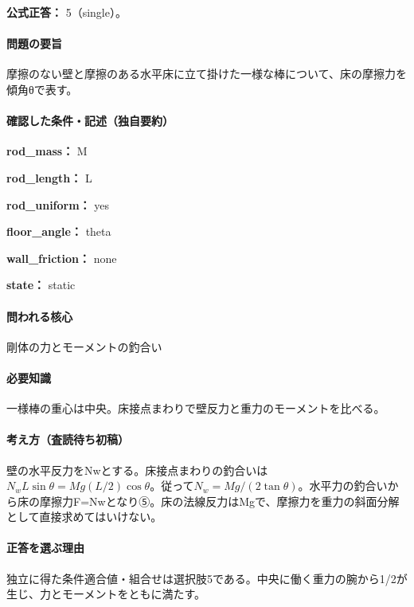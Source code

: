 \textbf{公式正答：} 5（single）。

\paragraph{問題の要旨} 摩擦のない壁と摩擦のある水平床に立て掛けた一様な棒について、床の摩擦力を傾角θで表す。

\paragraph{確認した条件・記述（独自要約）}\mbox{}\par

\noindent\textbf{rod\_mass：} M\par

\noindent\textbf{rod\_length：} L\par

\noindent\textbf{rod\_uniform：} yes\par

\noindent\textbf{floor\_angle：} theta\par

\noindent\textbf{wall\_friction：} none\par

\noindent\textbf{state：} static\par

\paragraph{問われる核心} 剛体の力とモーメントの釣合い

\paragraph{必要知識} 一様棒の重心は中央。床接点まわりで壁反力と重力のモーメントを比べる。

\paragraph{考え方（査読待ち初稿）} 壁の水平反力をNwとする。床接点まわりの釣合いは\(N_wL\sin\theta=Mg(L/2)\cos\theta\)。従って\(N_w=Mg/(2\tan\theta)\)。水平力の釣合いから床の摩擦力F=\allowbreak{}Nwとなり⑤。床の法線反力はMgで、摩擦力を重力の斜面分解として直接求めてはいけない。

\paragraph{正答を選ぶ理由} 独立に得た条件適合値・組合せは選択肢5である。中央に働く重力の腕から1/2が生じ、力とモーメントをともに満たす。


